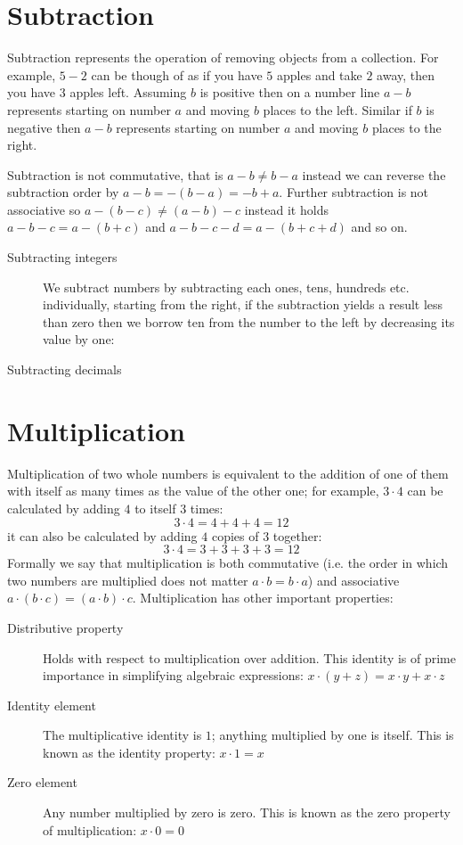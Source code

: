 \section{Subtraction}
Subtraction represents the operation of removing objects from a collection. For example, $5-2$ can be though of as if you have $5$ apples and take $2$ away, then you have $3$ apples left. Assuming $b$ is positive then on a number line $a-b$ represents starting on number $a$ and moving $b$ places to the left. Similar if $b$ is negative then $a-b$ represents starting on number $a$ and moving $b$ places to the right.

Subtraction is not commutative, that is $a - b \neq b - a$ instead we can reverse the subtraction order by $a - b = -(b - a) = -b + a$. Further subtraction is not associative so $a  - (b - c) \neq (a - b) - c$ instead it holds $a - b - c = a - (b + c)$ and $a - b - c - d = a - (b + c + d)$ and so on.
\begin{description}
\item [Subtracting integers] We subtract numbers by subtracting each
ones, tens, hundreds etc. individually, starting from the right, if the
subtraction yields a result less than zero then we borrow ten from the
number to the left by decreasing its value by one:
\begin{figure}[H]
\centering
{}
\end{figure}
\item [Subtracting decimals]
\end{description}

\section{Multiplication}
Multiplication of two whole numbers is equivalent to the addition of one of them with itself as many times as the value of the other one; for example, $3 \cdot 4$ can be calculated by adding $4$ to itself $3$ times:
\[
3 \cdot 4 = 4 + 4 + 4 = 12
\]
it can also be calculated by adding $4$ copies of $3$ together:
\[
3 \cdot 4 = 3 + 3 + 3 + 3 = 12
\]
Formally we say that multiplication is both commutative (i.e. the order in which two numbers are multiplied does not matter $a \cdot b = b \cdot a$) and associative $a \cdot (b \cdot c) = (a \cdot b) \cdot c$. Multiplication has other important properties:
\begin{description}
\item [Distributive property] Holds with respect to multiplication over addition. This identity is of prime importance in simplifying algebraic expressions: $x\cdot(y + z) = x\cdot y + x\cdot z$
\item [Identity element] The multiplicative identity is $1$; anything multiplied by one is itself. This is known as the identity property: $x\cdot 1 = x$
\item [Zero element] Any number multiplied by zero is zero. This is known as the zero property of multiplication: $x\cdot  0 = 0$
\end{description}

